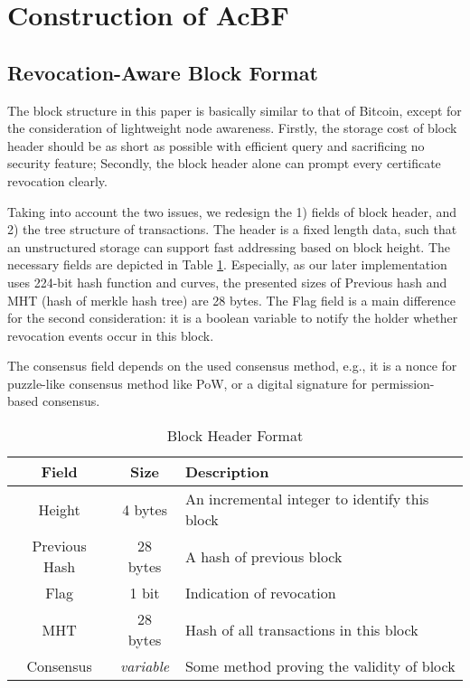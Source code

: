 \documentclass[conference]{IEEEtran}
\begin{document}
\section{Construction of AcBF}\label{sec:construction}
\subsection{Revocation-Aware Block Format}
\label{sec:format}
The block structure in this paper is basically similar to that of Bitcoin, except for the consideration of lightweight node awareness. Firstly, the storage cost of block header should be as short as possible with efficient query and sacrificing no security feature; Secondly, the block header alone can prompt every certificate revocation clearly. 

Taking into account the two issues, we redesign the 1) fields of block header, and 2) the tree structure of transactions. The header is a fixed length data, such that an unstructured storage can support fast addressing based on block height. The necessary fields are depicted in Table \ref{table:format}. Especially, as our later implementation uses 224-bit hash function and curves, the presented sizes of Previous hash and MHT (hash of merkle hash tree) are 28 bytes. The Flag field is a main difference for the second consideration: it is a boolean variable to notify the holder whether revocation events occur in this block.

The consensus field depends on the used consensus method, e.g., it is a nonce for puzzle-like consensus method like PoW, or a digital signature for permission-based consensus.


\begin{table}[t] 
	\caption{Block Header Format}\label{table:format}
	\centering
	\begin{tabular}{c|c|l}
		\hline\hline
		Field & Size & Description \\
		\hline
		Height & 4 bytes & An incremental integer to identify this block \\
		Previous Hash & 28 bytes & A hash of previous block \\
		Flag & 1 bit & Indication of revocation \\
		MHT & 28 bytes & Hash of all transactions in this block \\
		Consensus & \textit{variable} & Some method proving the validity of block\\
		\hline
	\end{tabular}
\end{table}
\end{document}
